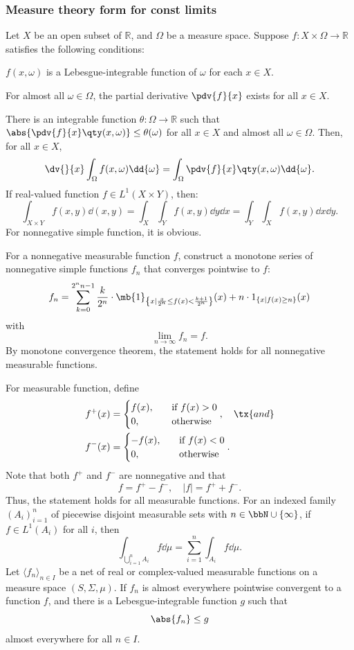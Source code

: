 \subsubsection{Measure theory form for const limits}
Let $X$ be an open subset of $\mathbb{R}$, and $\Omega$ be a measure space. Suppose $f\colon X\times\Omega\to\mathbb{R}$ satisfies the following conditions:
\ben
\item $f(x,\omega)$ is a Lebesgue-integrable function of $\omega$ for each $x\in X$.
\item For almost all $\omega\in\Omega$, the partial derivative $\pdv{f}{x}$ exists for all $x\in X$.
\item There is an integrable function $\theta\colon\Omega\to\mathbb{R}$ such that $\abs{\pdv{f}{x}\qty(x,\omega)}\leq\theta(\omega)$ for all $x\in X$ and almost all $\omega\in\Omega$.
\een
Then, for all $x\in X$,
\[\dv{}{x}\int_{\Omega}f(x,\omega)\dd{\omega}=\int_{\Omega}\pdv{f}{x}\qty(x,\omega)\dd{\omega}.\]
If real-valued function $f\in L^1(X\times Y)$, then:
\[\int_{X\times Y}f(x,y)\dd{(x,y)}=\int_X\int_Yf(x,y)\dd{y}\dd{x}=\int_Y\int_Xf(x,y)\dd{x}\dd{y}.\]
\bpr
For nonnegative simple function, it is obvious.

For a nonnegative measurable function $f$, construct a monotone series of nonnegative simple functions $f_n$ that converges pointwise to $f$:
\[f_n=\sum_{k=0}^{2^nn-1}\frac{k}{2^n}\cdot\mb{1}_{\left\{x\mid\frac{x}{2^n}\le f(x)<\frac{k+1}{2^n}\right\}}(x)+n\cdot 1_{\{x\mid f(x)\ge n\}}(x)\]
with
\[\lim_{n\to\infty}f_n=f.\]
By monotone convergence theorem, the statement holds for all nonnegative measurable functions.

For measurable function, define
\[\begin{aligned}
f^{+}(x)&=
\begin{cases}
f(x),\quad&\text{if\ }f(x)>0\\
0,\quad &\text{otherwise}
\end{cases},\quad\tx{and}\\
f^{-}(x)&=
\begin{cases}
-f(x),\quad&\text{if\ }f(x)<0\\
0,\quad&\text{otherwise}
\end{cases}.
\end{aligned}\]
Note that both $f^+$ and $f^-$ are nonnegative and that
\[f=f^+-f^-,\quad |f|=f^++f^-.\]
Thus, the statement holds for all measurable functions.
\epr
{}
For an indexed family $(A_i)_{i=1}^n$ of piecewise disjoint measurable sets with $n\in\bbN\cup\{\infty\}$, if $f\in L^1(A_i)$ for all $i$, then
\[\int_{\bigcup_{i=1}^nA_i}f\dd{\mu}=\sum_{i=1}^n\int_{A_i}f\dd{\mu}.\]
Let $\langle f_n\rangle_{n\in I}$ be a net of real or complex-valued measurable functions on a measure space $(S,\Sigma,\mu)$. If $f_n$ is almost everywhere pointwise convergent to a function $f$, and there is a Lebesgue-integrable function $g$ such that
\[\abs{f_n}\leq g\]
almost everywhere for all $n\in I$.

